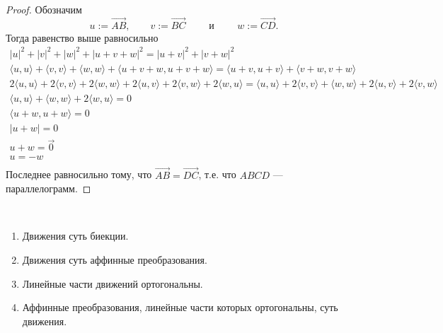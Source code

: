 \documentclass[12pt,a4paper]{article}
\begin{document}
    \begin{proof}
        Обозначим
        \[
            u := \overrightarrow{AB},
            \qquad
            v := \overrightarrow{BC}
            \qquad \text{ и } \qquad
            w := \overrightarrow{CD}.
        \]
        Тогда равенство выше равносильно
        \begin{gather*}
            |u|^2 + |v|^2 + |w|^2 + |u + v + w|^2 = |u + v|^2 + |v + w|^2\\
            \langle u, u \rangle + \langle v, v \rangle + \langle w, w \rangle + \langle u + v + w, u + v + w \rangle = \langle u + v, u + v \rangle + \langle v + w, v + w \rangle\\
            2\langle u, u \rangle + 2\langle v, v \rangle + 2\langle w, w \rangle + 2\langle u, v \rangle + 2\langle v, w \rangle + 2\langle w, u \rangle = \langle u, u \rangle + 2\langle v, v \rangle + \langle w, w \rangle + 2\langle u, v \rangle + 2\langle v, w \rangle\\
            \langle u, u \rangle + \langle w, w \rangle + 2\langle w, u \rangle = 0\\
            \langle u + w, u + w \rangle = 0\\
            |u + w| = 0\\
            u + w = \vec{0}\\
            u = - w\\
        \end{gather*}
        Последнее равносильно тому, что $\overrightarrow{AB} = \overrightarrow{DC}$, т.е. что $ABCD$ --- параллелограмм.
    \end{proof}

    \begin{theorem}\ 
        \begin{enumerate}
            \item \label{motion-definition-equivakence-theorem-bijection-item} Движения суть биекции.
            \item \label{motion-definition-equivakence-theorem-affine-item} Движения суть аффинные преобразования.
            \item \label{motion-definition-equivakence-theorem-orthogonal-item} Линейные части движений ортогональны.
            \item \label{motion-definition-equivakence-theorem-reverse-item} Аффинные преобразования, линейные части которых ортогональны, суть движения.
        \end{enumerate}
    \end{theorem}
\end{document}
